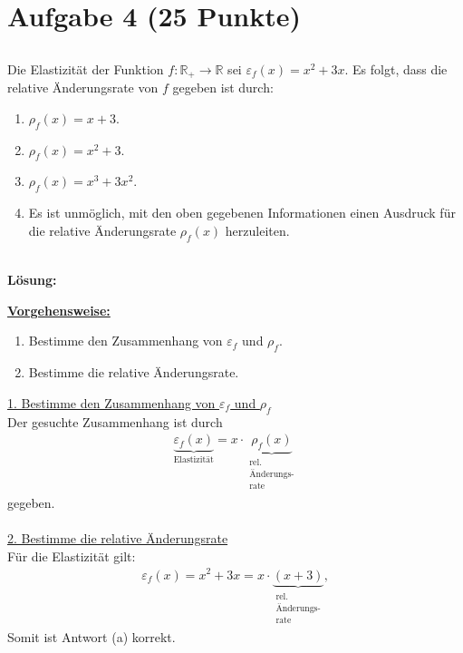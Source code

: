 \section*{Aufgabe 4 (25 Punkte)}
\vspace{0.4cm}
\subsection*{}
Die Elastizität der Funktion $f : \mathbb{R}_+ \to \mathbb{R}$
sei $\varepsilon_{f}(x) = x^2 + 3x$.
Es folgt, dass die relative Änderungsrate von $f$ gegeben ist durch:
\renewcommand{\labelenumi}{(\alph{enumi})}
\begin{enumerate}
\item $\rho_f(x) = x+3$.
\item $\rho_f(x) = x^2 + 3$.
\item $\rho_f(x) = x^3 + 3x^2$.
\item Es ist unmöglich, mit den oben gegebenen Informationen einen Ausdruck für die relative Änderungsrate $\rho_f(x)$ herzuleiten.
\end{enumerate}
\ \\
\textbf{Lösung:}
\begin{mdframed}
\underline{\textbf{Vorgehensweise:}}
\renewcommand{\labelenumi}{\theenumi.}
\begin{enumerate}
\item Bestimme den Zusammenhang von $\varepsilon_f$ und $\rho_f$.
\item Bestimme die relative Änderungsrate.
\end{enumerate}
\end{mdframed}

\underline{1. Bestimme den Zusammenhang von $\varepsilon_f$ und $\rho_f$}\\
Der gesuchte Zusammenhang ist durch 
\begin{align*}
\underbrace{\varepsilon_f(x)}_{\text{Elastizität}}
= 
x \cdot \underbrace{ \rho_f(x)}_{\substack{\text{rel.}
\\ \text{Änderungs-} \\
\text{rate}}}
\end{align*}
gegeben.\\
\\

\underline{2. Bestimme die relative Änderungsrate}\\
Für die Elastizität gilt:
\begin{align*}
\varepsilon_f(x) = x^2 + 3x = x \cdot
\underbrace{ (x+3)}_{\substack{\text{rel.}
\\ \text{Änderungs-} \\
\text{rate}}},
\end{align*}
Somit ist Antwort (a) korrekt.

